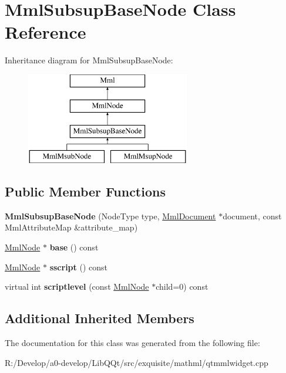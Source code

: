 \hypertarget{class_mml_subsup_base_node}{}\section{Mml\+Subsup\+Base\+Node Class Reference}
\label{class_mml_subsup_base_node}
Inheritance diagram for Mml\+Subsup\+Base\+Node\+:\begin{figure}[H]
\begin{center}
\leavevmode
\includegraphics[height=4.000000cm]{class_mml_subsup_base_node}
\end{center}
\end{figure}
\subsection*{Public Member Functions}
\begin{DoxyCompactItemize}
\item 
\mbox{\label{class_mml_subsup_base_node_aaf9a5a114e39c30f3d34083175dd49a2}} 
{\bfseries Mml\+Subsup\+Base\+Node} (Node\+Type type, \mbox{\hyperlink{class_mml_document}{Mml\+Document}} $\ast$document, const Mml\+Attribute\+Map \&attribute\+\_\+map)
\item 
\mbox{\label{class_mml_subsup_base_node_a9768f48597498f2a5a129034052c638c}} 
\mbox{\hyperlink{class_mml_node}{Mml\+Node}} $\ast$ {\bfseries base} () const
\item 
\mbox{\label{class_mml_subsup_base_node_a89449c501e83f61366a70fe635275465}} 
\mbox{\hyperlink{class_mml_node}{Mml\+Node}} $\ast$ {\bfseries sscript} () const
\item 
\mbox{\label{class_mml_subsup_base_node_ac66622f6cfd193bb7f05005ec40e3606}} 
virtual int {\bfseries scriptlevel} (const \mbox{\hyperlink{class_mml_node}{Mml\+Node}} $\ast$child=0) const
\end{DoxyCompactItemize}
\subsection*{Additional Inherited Members}


The documentation for this class was generated from the following file\+:\begin{DoxyCompactItemize}
\item 
R\+:/\+Develop/a0-\/develop/\+Lib\+Q\+Qt/src/exquisite/mathml/qtmmlwidget.\+cpp\end{DoxyCompactItemize}
